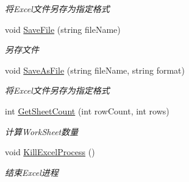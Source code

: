 \begin{DoxyCompactItemize}
\begin{DoxyCompactList}\small\item\em 将\-Excel文件另存为指定格式 \end{DoxyCompactList}\item 
void \hyperlink{class_x_c_l_net_tools_1_1_data_handler_1_1_excel_helper_a7c3372f5c5fc327080f3b35d85ee4c39}{Save\-File} (string file\-Name)
\begin{DoxyCompactList}\small\item\em 另存文件 \end{DoxyCompactList}\item 
void \hyperlink{class_x_c_l_net_tools_1_1_data_handler_1_1_excel_helper_a401a9ce1828e68dd716bfa13f2e4d9f1}{Save\-As\-File} (string file\-Name, string format)
\begin{DoxyCompactList}\small\item\em 将\-Excel文件另存为指定格式 \end{DoxyCompactList}\item 
int \hyperlink{class_x_c_l_net_tools_1_1_data_handler_1_1_excel_helper_af0a259184ab65d03bd80395f273d1016}{Get\-Sheet\-Count} (int row\-Count, int rows)
\begin{DoxyCompactList}\small\item\em 计算\-Work\-Sheet数量 \end{DoxyCompactList}\item 
void \hyperlink{class_x_c_l_net_tools_1_1_data_handler_1_1_excel_helper_aed272e9ef2e170dadd73a8e7d761b8cd}{Kill\-Excel\-Process} ()
\begin{DoxyCompactList}\small\item\em 结束\-Excel进程 \end{DoxyCompactList}\end{DoxyCompactItemize}
